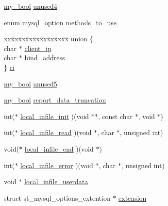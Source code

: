 \begin{DoxyCompactItemize}
\item 
\hyperlink{mysql_8h_a74cd599039dcf29c6e6d342cf4efd0a8}{my\+\_\+bool} \hyperlink{structst__mysql__options_a23ea8e676bc687b865b5842254e88e6d}{unused4}
\item 
enum \hyperlink{mysql_8h_a255d4e9a14d73dde30125232fefac836}{mysql\+\_\+option} \hyperlink{structst__mysql__options_a76fecd9908ce3203903d987e4b3c5599}{methods\+\_\+to\+\_\+use}
\item 
\begin{tabbing}
xx\=xx\=xx\=xx\=xx\=xx\=xx\=xx\=xx\=\kill
union \{\\
\>char $\ast$ \hyperlink{structst__mysql__options_a303edbbc594a8ccbfa3de34aa85ae509}{client\_ip}\\
\>char $\ast$ \hyperlink{structst__mysql__options_a91d2448d2fd587a02752f34e64f9680d}{bind\_address}\\
\} \hyperlink{structst__mysql__options_a9ffe17c90b136c23df2cabd2e0eac835}{ci}\\

\end{tabbing}\item 
\hyperlink{mysql_8h_a74cd599039dcf29c6e6d342cf4efd0a8}{my\+\_\+bool} \hyperlink{structst__mysql__options_a6a2e197dd368bd0c110ab2e962369abd}{unused5}
\item 
\hyperlink{mysql_8h_a74cd599039dcf29c6e6d342cf4efd0a8}{my\+\_\+bool} \hyperlink{structst__mysql__options_a095ec6fb5b58914a518522376a0d49ba}{report\+\_\+data\+\_\+truncation}
\item 
int($\ast$ \hyperlink{structst__mysql__options_a3524e3b6573ae25e1b3f26b19d818f10}{local\+\_\+infile\+\_\+init} )(void $\ast$$\ast$, const char $\ast$, void $\ast$)
\item 
int($\ast$ \hyperlink{structst__mysql__options_adff315c42cebf0390d3d14f1bee762bc}{local\+\_\+infile\+\_\+read} )(void $\ast$, char $\ast$, unsigned int)
\item 
void($\ast$ \hyperlink{structst__mysql__options_a45658a7c3298bbd90e9dc61cee282f05}{local\+\_\+infile\+\_\+end} )(void $\ast$)
\item 
int($\ast$ \hyperlink{structst__mysql__options_a79b831a574398e1ba37f0c7052318269}{local\+\_\+infile\+\_\+error} )(void $\ast$, char $\ast$, unsigned int)
\item 
void $\ast$ \hyperlink{structst__mysql__options_a54cbdc47b238a839eff42269b871380d}{local\+\_\+infile\+\_\+userdata}
\item 
struct st\+\_\+mysql\+\_\+options\+\_\+extention $\ast$ \hyperlink{structst__mysql__options_ac16c1d9c8c28b3daeabb7222cda5e8c2}{extension}
\end{DoxyCompactItemize}


